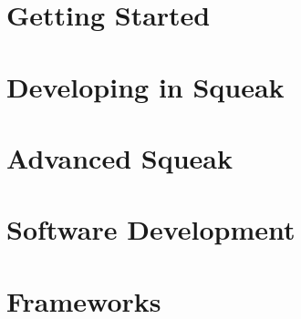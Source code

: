 \documentclass[a4paper,10pt,twoside]{book}
\begin{document}
\vfill
%
\tableofcontents
\sloppy %

\mainmatter
\part{Getting Started}




\part{Developing in Squeak}







\part{Advanced Squeak}


\part{Software Development}

%
%
%

\part{Frameworks}

%


\end{document}
